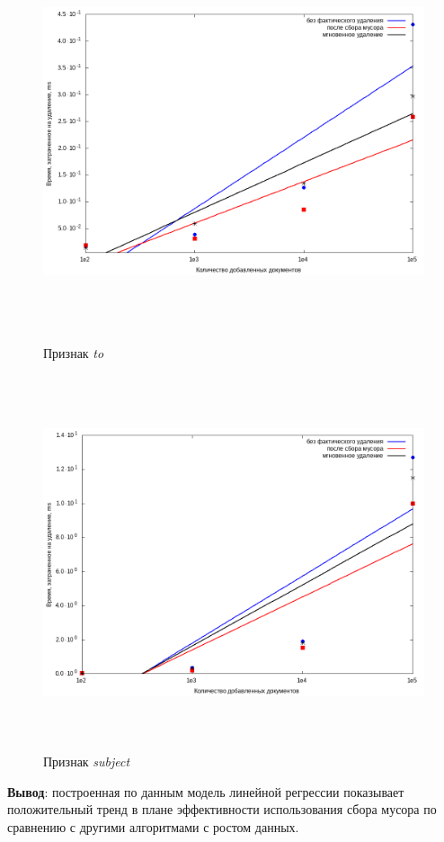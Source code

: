 \begin{figure}[H]
\includegraphics[width=\linewidth, height=11cm]{fig/to.png}
\caption{Признак \textit{to}}
\includegraphics[width=\linewidth, height=11cm]{fig/subject.png}
\caption{Признак \textit{subject}}
\end{figure}

\textbf{Вывод}: построенная по данным модель линейной регрессии показывает
положительный тренд в плане эффективности использования сбора мусора по сравнению
с другими алгоритмами с ростом данных.

